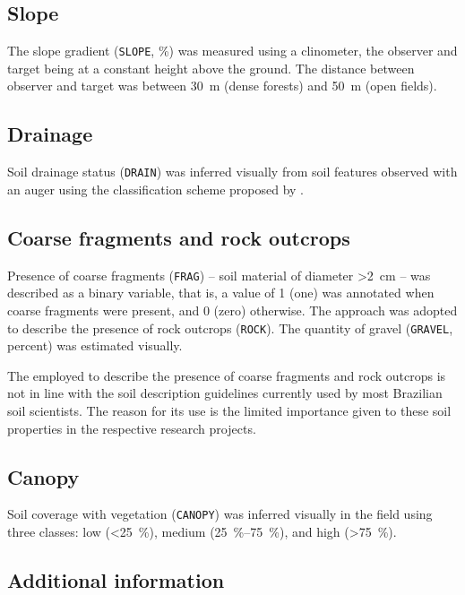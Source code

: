 \tocless\subsection{Slope}

The slope gradient (\texttt{SLOPE}, \si{\percent}) was measured using a clinometer, the observer
and target being at a constant height above the ground. The distance between observer and target was 
between \SI{30}{\metre} (dense forests) and \SI{50}{\metre} (open fields).

\tocless\subsection{Drainage}

Soil drainage status (\texttt{DRAIN}) was inferred visually from soil features observed with an 
auger using the classification scheme proposed by .

\tocless\subsection{Coarse fragments and rock outcrops}

Presence of coarse fragments (\texttt{FRAG}) -- soil material of diameter \SI{>2}{\centi\metre} -- was 
described 
as a binary variable, that is, a value of \num{1} (one) was annotated when coarse fragments were present, and 
\num{0} (zero) otherwise. The approach was adopted to describe the presence of rock outcrops (\texttt{ROCK}). 
The 
quantity of gravel (\texttt{GRAVEL}, \si{percent}) was estimated visually.

The employed to describe the presence of coarse fragments and rock outcrops is not in line with the soil 
description guidelines currently used by most Brazilian soil scientists. The reason for its use is the limited 
importance given to these soil properties in the respective research projects.

\tocless\subsection{Canopy}

Soil coverage with vegetation (\texttt{CANOPY}) was inferred visually in the field using three classes: 
low (\SI{<25}{\percent}), medium (\SIrange{25}{75}{\percent}), and high (\SI{>75}{\percent}).

\tocless\subsection{Additional information}

